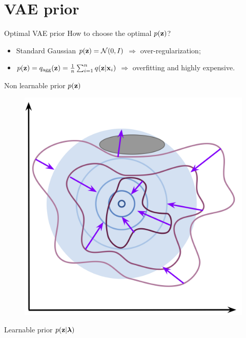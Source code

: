 \section{VAE prior}
\begin{frame}{Optimal VAE prior}
	How to choose the optimal $p(\mathbf{z})$?
	\begin{itemize}
		\item Standard Gaussian $p(\mathbf{z}) = \mathcal{N}(0, I)$ $\Rightarrow$ over-regularization;
		\item $p(\mathbf{z}) = q_{\text{agg}}(\mathbf{z}) = \frac{1}{n}\sum_{i=1}^n q(\mathbf{z} | \mathbf{x}_i)$ $\Rightarrow$ overfitting and highly expensive.
	\end{itemize}
	\vspace{-0.3cm}
	\begin{minipage}[t]{0.5\columnwidth}
		\begin{block}{Non learnable prior $p(\mathbf{z})$}
			\begin{figure}[h]
				\centering
				\includegraphics[width=0.8\linewidth]{figs/non_learnable_prior}
			\end{figure}
		\end{block}
	\end{minipage}%
	\begin{minipage}[t]{0.5\columnwidth}
		\begin{block}{Learnable prior $p(\mathbf{z} | \boldsymbol{\lambda})$}
			\begin{figure}[h]
				\centering

\end{figure}
\end{block}
\end{minipage}
\end{frame}
